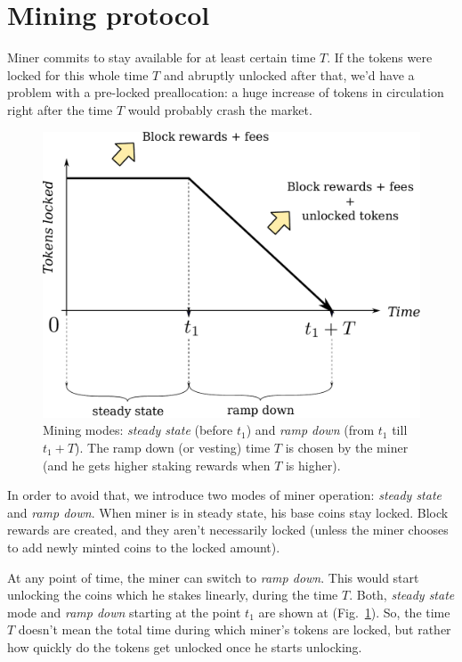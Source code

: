 \documentclass[longbibliography,nofootinbib,twocolumn]{revtex4-1}
\newcommand{\figref}[1]{Fig.~\ref{#1}}
\begin{document}
\section{Mining protocol}

Miner commits to stay available for at least certain time $T$.
If the tokens were locked for this whole time $T$ and abruptly unlocked after that, we'd have a problem with a pre-locked preallocation:
a huge increase of tokens in circulation right after the time $T$ would probably crash the market.

\begin{figure}
    \includegraphics[width=\columnwidth]{pdf/mining-modes.pdf}
    \caption{
        Mining modes: \emph{steady state} (before $t_1$) and \emph{ramp down} (from $t_1$ till $t_1 + T$).
        The ramp down (or vesting) time $T$ is chosen by the miner (and he gets higher staking rewards when $T$ is higher).
    }
    \label{fig:mining-modes}
\end{figure}

In order to avoid that, we introduce two modes of miner operation: \emph{steady state} and \emph{ramp down}.
When miner is in steady state, his base coins stay locked.
Block rewards are created, and they aren't necessarily locked (unless the miner chooses to add newly minted coins to the locked amount).

At any point of time, the miner can switch to \emph{ramp down}.
This would start unlocking the coins which he stakes linearly, during the time $T$.
Both, \emph{steady state} mode and \emph{ramp down} starting at the point $t_1$ are shown at (\figref{fig:mining-modes}).
So, the time $T$ doesn't mean the total time during which miner's tokens are locked, but rather how quickly do the tokens get unlocked once he starts
unlocking.
\end{document}
